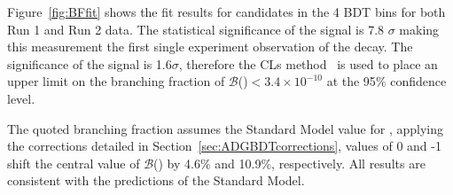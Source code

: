 {Figure~\ref{fig:BFfit} shows the fit results for \bmumu candidates in the 4 BDT bins for both Run 1 and Run 2 data. %
The statistical significance of the \bsmumu signal is 7.8 $\sigma$ making this measurement the first single experiment observation of the \bsmumu decay. The significance of the \bdmumu signal is 1.6$\sigma$, therefore the CLs method~\cite{} is used to place an upper limit on the branching fraction of $\mathcal{B}$(\bdmumu)$ < 3.4 \times 10^{-10}$ at the 95$\%$ confidence level.

The quoted \bsmumu branching fraction assumes the Standard Model value for \ADG, applying the corrections detailed in Section~\ref{sec:ADGBDTcorrections}, \ADG values of 0 and -1 shift the central value of $\mathcal{B}$(\bsmumu) by 4.6$\%$ and 10.9$\%$, respectively. All results are consistent with the predictions of the Standard Model.





}
